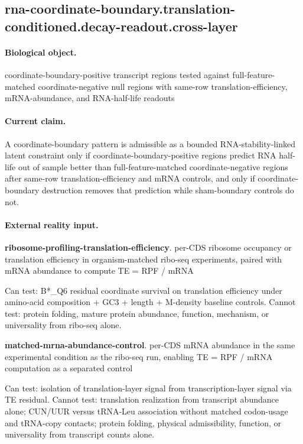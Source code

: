 \subsection{rna-coordinate-boundary.translation-conditioned.decay-readout.cross-layer}

\paragraph{Biological object.} coordinate-boundary-positive transcript regions tested against full-feature-matched coordinate-negative null regions with same-row translation-efficiency, mRNA-abundance, and RNA-half-life readouts

\paragraph{Current claim.} A coordinate-boundary pattern is admissible as a bounded RNA-stability-linked latent constraint only if coordinate-boundary-positive regions predict RNA half-life out of sample better than full-feature-matched coordinate-negative regions after same-row translation-efficiency and mRNA controls, and only if coordinate-boundary destruction removes that prediction while sham-boundary controls do not.

\paragraph{External reality input.}
\textbf{ribosome-profiling-translation-efficiency}. per-CDS ribosome occupancy or translation efficiency in organism-matched ribo-seq experiments, paired with mRNA abundance to compute TE = RPF / mRNA

Can test: B*\_Q6 residual coordinate survival on translation efficiency under amino-acid composition + GC3 + length + M-density baseline controls. Cannot test: protein folding, mature protein abundance, function, mechanism, or universality from ribo-seq alone.

\textbf{matched-mrna-abundance-control}. per-CDS mRNA abundance in the same experimental condition as the ribo-seq run, enabling TE = RPF / mRNA computation as a separated control

Can test: isolation of translation-layer signal from transcription-layer signal via TE residual. Cannot test: translation realization from transcript abundance alone; CUN/UUR versus tRNA-Leu association without matched codon-usage and tRNA-copy contacts; protein folding, physical admissibility, function, or universality from transcript counts alone.

